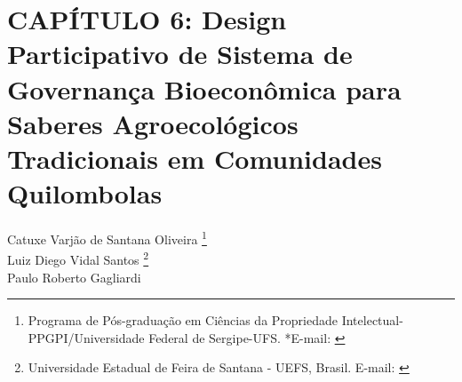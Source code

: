 \pagestyle{plain}

\chapter{CAPÍTULO 6: Design Participativo de Sistema de Governança Bioeconômica para Saberes Agroecológicos Tradicionais em Comunidades Quilombolas}


\begin{flushright}
Catuxe Varjão de Santana Oliveira  \footnote[1]{Programa de Pós-graduação em Ciências da Propriedade Intelectual-PPGPI/Universidade Federal de Sergipe-UFS. *E-mail:  \href{mailto:catuxe@academico.ufs.br}{}}
\\[0.3cm]
Luiz Diego Vidal Santos \footnote[2]{Universidade Estadual de Feira de Santana - UEFS, Brasil. E-mail: \href{mailto:ldvsantos@uefs.br}{}}
\\[0.3cm]
Paulo Roberto Gagliardi \footnotemark[1]
\end{flushright}

